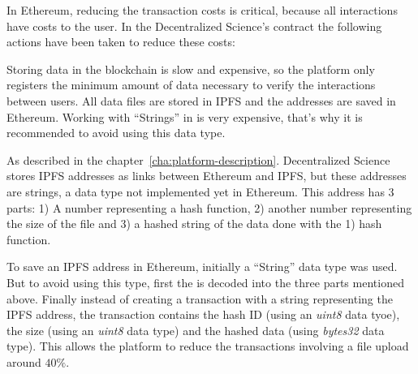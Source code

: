In Ethereum, reducing the transaction costs is critical, because all
interactions have costs to the user. In the Decentralized Science's contract the
following actions have been taken to reduce these costs:

\begin{itemize}
   Storing data in the
  blockchain is slow and expensive, so the platform only registers the minimum
  amount of data necessary to verify the interactions between users. All data
  files are stored in IPFS and the addresses are saved in Ethereum.  Working with ``Strings'' in  is very
  expensive, that's why it is recommended to avoid using this data type.

  As described in the chapter~\ref{cha:platform-description}. Decentralized
  Science stores IPFS addresses as links between Ethereum and IPFS, but these
  addresses are  strings, a data type not implemented yet in
  Ethereum. This address has 3 parts: 1) A number representing a hash function,
  2) another number representing the size of the file and 3) a hashed string of
  the data done with the 1) hash function.

  To save an IPFS address in Ethereum, initially a ``String'' data type was
  used. But to avoid using this type, first the  is decoded into the
  three parts mentioned above. Finally instead of creating a transaction with a
  string representing the IPFS address, the transaction contains the hash ID
  (using an \emph{uint8} data tyoe), the size (using an \emph{uint8} data type)
  and the hashed data (using \emph{bytes32} data type). This allows the platform
  to reduce the transactions involving a file upload around $40\%$.
\end{itemize}

